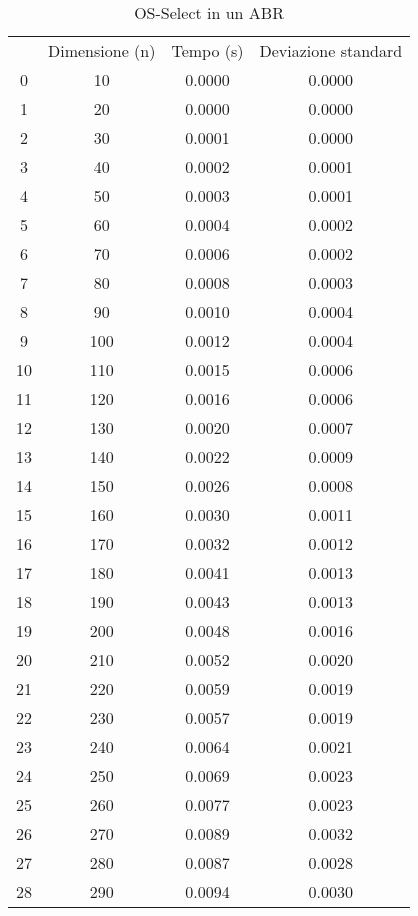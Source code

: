 \begin{table}[H]
\centering
\caption{OS-Select in un ABR}
\label{OS-Select in un ABR}
\begin{tabular}{cccc}
 & Dimensione (n) & Tempo (s) & Deviazione standard \\
0 & 10 & 0.0000 & 0.0000 \\
\cline{1-4}
1 & 20 & 0.0000 & 0.0000 \\
\cline{1-4}
2 & 30 & 0.0001 & 0.0000 \\
\cline{1-4}
3 & 40 & 0.0002 & 0.0001 \\
\cline{1-4}
4 & 50 & 0.0003 & 0.0001 \\
\cline{1-4}
5 & 60 & 0.0004 & 0.0002 \\
\cline{1-4}
6 & 70 & 0.0006 & 0.0002 \\
\cline{1-4}
7 & 80 & 0.0008 & 0.0003 \\
\cline{1-4}
8 & 90 & 0.0010 & 0.0004 \\
\cline{1-4}
9 & 100 & 0.0012 & 0.0004 \\
\cline{1-4}
10 & 110 & 0.0015 & 0.0006 \\
\cline{1-4}
11 & 120 & 0.0016 & 0.0006 \\
\cline{1-4}
12 & 130 & 0.0020 & 0.0007 \\
\cline{1-4}
13 & 140 & 0.0022 & 0.0009 \\
\cline{1-4}
14 & 150 & 0.0026 & 0.0008 \\
\cline{1-4}
15 & 160 & 0.0030 & 0.0011 \\
\cline{1-4}
16 & 170 & 0.0032 & 0.0012 \\
\cline{1-4}
17 & 180 & 0.0041 & 0.0013 \\
\cline{1-4}
18 & 190 & 0.0043 & 0.0013 \\
\cline{1-4}
19 & 200 & 0.0048 & 0.0016 \\
\cline{1-4}
20 & 210 & 0.0052 & 0.0020 \\
\cline{1-4}
21 & 220 & 0.0059 & 0.0019 \\
\cline{1-4}
22 & 230 & 0.0057 & 0.0019 \\
\cline{1-4}
23 & 240 & 0.0064 & 0.0021 \\
\cline{1-4}
24 & 250 & 0.0069 & 0.0023 \\
\cline{1-4}
25 & 260 & 0.0077 & 0.0023 \\
\cline{1-4}
26 & 270 & 0.0089 & 0.0032 \\
\cline{1-4}
27 & 280 & 0.0087 & 0.0028 \\
\cline{1-4}
28 & 290 & 0.0094 & 0.0030 \\

\end{tabular}
\end{table}
